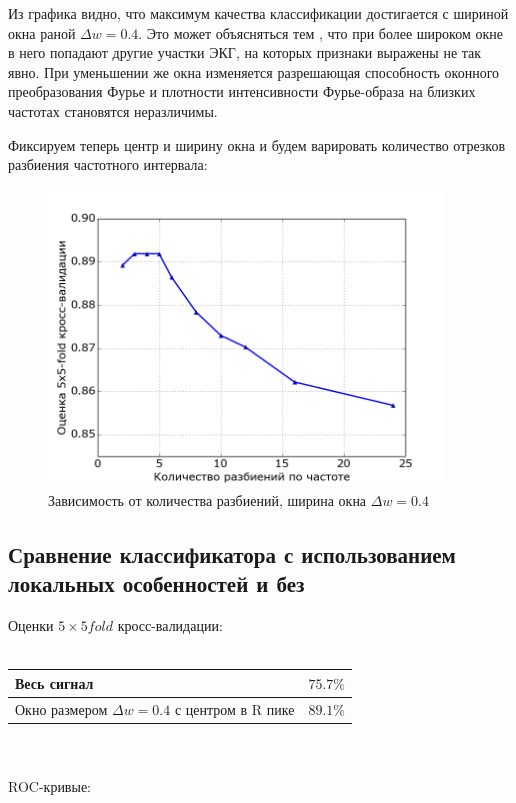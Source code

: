 \documentclass[a4paper,12pt]{extarticle}
\begin{document}
Из графика видно, что максимум качества классификации достигается с шириной окна раной $\Delta w = 0.4$. Это может объясняться тем , что при более широком окне в него попадают другие участки ЭКГ, на которых признаки выражены не так явно. При уменьшении же окна изменяется разрешающая способность оконного преобразования Фурье и плотности интенсивности Фурье-образа на близких частотах становятся неразличимы.

Фиксируем теперь центр и ширину окна и будем варировать количество отрезков разбиения частотного интервала:

\begin{figure}[h]
    \begin{center}
        \includegraphics[width=105mm]{img/CV_on_fq_divisions.png}
    \end{center}
    \caption{Зависимость от количества разбиений, ширина окна $\Delta w = 0.4$}
\end{figure}

\subsection{Сравнение классификатора с использованием локальных особенностей и без}

Оценки $5\times5 fold$ кросс-валидации:
\\~\\
\begin{tabular}{|l|c|}
    \hline
    Весь сигнал & $75.7\%$ \\
    \hline
    Окно размером $\Delta w = 0.4$ с центром в R пике & $89.1\%$\\
    \hline
\end{tabular}
\\~\\
ROC-кривые:
\end{document}
